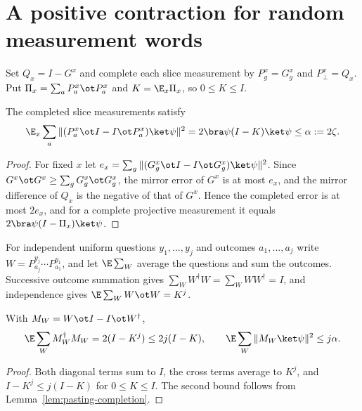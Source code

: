 \section{A positive contraction for random measurement words}
\label{sec:hat-consistency}

Set $Q_x=I-G^x$ and complete each slice measurement by $P^x_g=G^x_g$ and
$P^x_\bot=Q_x$.  Put $\Pi_x=\sum_aP^x_a\ot P^x_a$ and $K=\E_x\Pi_x$, so
$0\le K\le I$.

\begin{lemma}[Completion]\label{lem:pasting-completion}
	\leanok
	The completed slice measurements satisfy
	\[
		\E_x\sum_a\|(P^x_a\ot I-I\ot P^x_a)\ket\psi\|^2
		=2\bra\psi(I-K)\ket\psi\le\alpha:=2\zeta.
	\]
\end{lemma}
\begin{proof}
	\leanok
	For fixed $x$ let
	$e_x=\sum_g\|(G^x_g\ot I-I\ot G^x_g)\ket\psi\|^2$.  Since
	$G^x\ot G^x\ge\sum_gG^x_g\ot G^x_g$, the mirror error of $G^x$ is at most
	$e_x$, and the mirror difference of $Q_x$ is the negative of that of
	$G^x$.  Hence the completed error is at most $2e_x$, and for a complete
	projective measurement it equals $2\bra\psi(I-\Pi_x)\ket\psi$.
\end{proof}

For independent uniform questions $y_1,\ldots,y_j$ and outcomes
$a_1,\ldots,a_j$ write $W=P^{y_j}_{a_j}\cdots P^{y_1}_{a_1}$, and let
$\E\sum_W$ average the questions and sum the outcomes.  Successive
outcome summation gives $\sum_WW^\dagger W=\sum_WWW^\dagger=I$, and
independence gives $\E\sum_WW\ot W=K^j$.

\begin{lemma}\label{lem:random-word-energy}
	\leanok
	With $M_W=W\ot I-I\ot W^\dagger$,
	\[
		\E\sum_WM_W^\dagger M_W=2(I-K^j)\le2j(I-K),
		\qquad
		\E\sum_W\|M_W\ket\psi\|^2\le j\alpha.
	\]
\end{lemma}
\begin{proof}
	\leanok
	Both diagonal terms sum to $I$, the cross terms average to $K^j$, and
	$I-K^j\le j(I-K)$ for $0\le K\le I$.  The second bound follows from
	Lemma~\ref{lem:pasting-completion}.
\end{proof}

